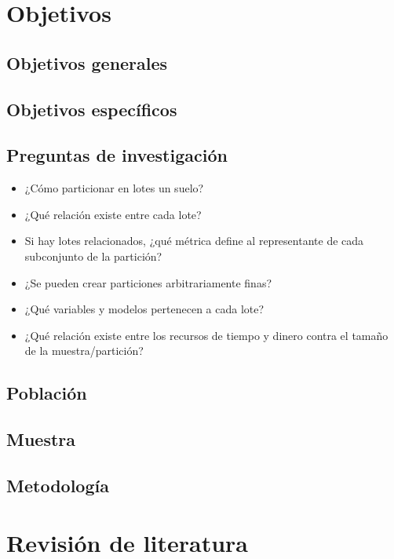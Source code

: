 \documentclass{report}
\begin{document}
\section{Objetivos}


\subsection{Objetivos generales}


\subsection{Objetivos específicos}



\subsection{Preguntas de investigación}

\begin{itemize}
    \item ¿Cómo particionar en lotes un suelo?
    \item ¿Qué relación existe entre cada lote?
    \item Si hay lotes relacionados, ¿qué métrica define al representante de cada subconjunto de la partición?
    \item ¿Se pueden crear particiones arbitrariamente finas?
    
    \item ¿Qué variables y modelos pertenecen a cada lote?
    \item ¿Qué relación existe entre los recursos de tiempo y dinero contra el tamaño de la muestra/partición?
\end{itemize}

\subsection{Población}


\subsection{Muestra}


\subsection{Metodología}


\section{Revisión de literatura}
\end{document}
